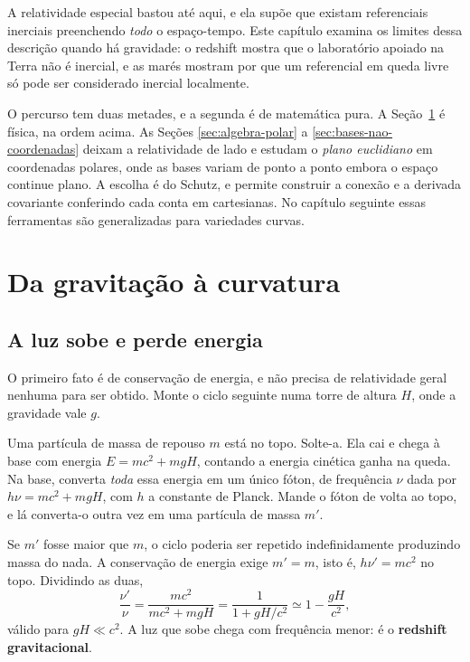 \documentclass[12pt,a4paper,oneside]{book}
\theoremstyle{rgplain}
\theoremstyle{rgremark}
\begin{document}
A relatividade especial bastou até aqui, e ela supõe que existam referenciais
inerciais preenchendo \emph{todo} o espaço-tempo. Este capítulo examina os
limites dessa descrição quando há gravidade: o redshift mostra que o
laboratório apoiado na Terra não é inercial, e as marés mostram por que um
referencial em queda livre só pode ser considerado inercial localmente.

O percurso tem duas metades, e a segunda é de matemática pura. A
Seção~\ref{sec:gravitacao-curvatura} é física, na ordem acima. As Seções
\ref{sec:algebra-polar} a \ref{sec:bases-nao-coordenadas} deixam a
relatividade de lado e estudam o \emph{plano euclidiano} em coordenadas
polares, onde as bases variam de ponto a ponto embora o espaço continue plano.
A escolha é do Schutz, e permite construir a conexão e a derivada covariante
conferindo cada conta em cartesianas. No capítulo seguinte essas ferramentas
são generalizadas para variedades curvas.

\section{Da gravitação à curvatura}
\label{sec:gravitacao-curvatura}

\subsection*{A luz sobe e perde energia}

O primeiro fato é de conservação de energia, e não precisa de relatividade
geral nenhuma para ser obtido. Monte o ciclo seguinte numa torre de altura $H$,
onde a gravidade vale $g$.

Uma partícula de massa de repouso $m$ está no topo. Solte-a. Ela cai e chega
à base com energia $E=m c^2+mgH$, contando a energia cinética ganha na queda.
Na base, converta \emph{toda} essa energia em um único fóton, de frequência
$\nu$ dada por $h\nu=mc^2+mgH$, com $h$ a constante de Planck.
Mande o fóton de volta ao topo, e lá converta-o outra vez em uma partícula de
massa $m'$.

Se $m'$ fosse maior que $m$, o ciclo poderia ser repetido indefinidamente
produzindo massa do nada. A conservação de energia exige $m'=m$, isto é,
$h\nu'=mc^2$ no topo. Dividindo as duas,
\begin{equation}
  \frac{\nu'}{\nu}=\frac{mc^2}{mc^2+mgH}=\frac{1}{1+gH/c^2}
  \simeq 1-\frac{gH}{c^2} ,
  \label{eq:redshift-torre}
\end{equation}
válido para $gH\ll c^2$. A luz que sobe chega com frequência menor: é o
\textbf{redshift gravitacional}.
\end{document}
